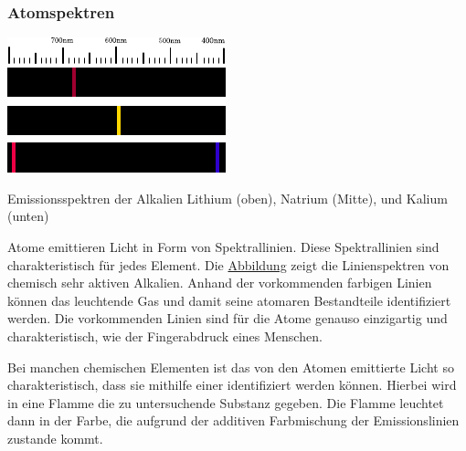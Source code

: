 \documentclass{tuftebook}
\begin{document}
        \subsubsection{Atomspektren}
        \begin{marginfigure}
            \centering
            \includegraphics[width=\linewidth]{figures/akaliespektrallinien.pdf}
            \caption{Emissionsspektren der Alkalien Lithium (oben), Natrium (Mitte), und Kalium (unten)}
            \label{fig:akaliespektrallinien}
        \end{marginfigure}
        Atome emittieren Licht in Form von Spektrallinien. Diese Spektrallinien sind charakteristisch für jedes Element. Die \hyperref[fig:akaliespektrallinien]{Abbildung} zeigt die Linienspektren von chemisch sehr aktiven Alkalien. Anhand der vorkommenden farbigen Linien können das leuchtende Gas und damit seine atomaren Bestandteile  identifiziert werden. Die vorkommenden Linien sind für die Atome genauso einzigartig und charakteristisch, wie der Fingerabdruck eines Menschen.
        
        Bei manchen chemischen Elementen ist das von den Atomen emittierte Licht so charakteristisch, dass sie mithilfe einer  identifiziert werden können. Hierbei wird in eine Flamme die zu untersuchende Substanz gegeben. Die Flamme leuchtet dann in der Farbe, die aufgrund der additiven Farbmischung der Emissionslinien zustande kommt. 
        
\end{document}
